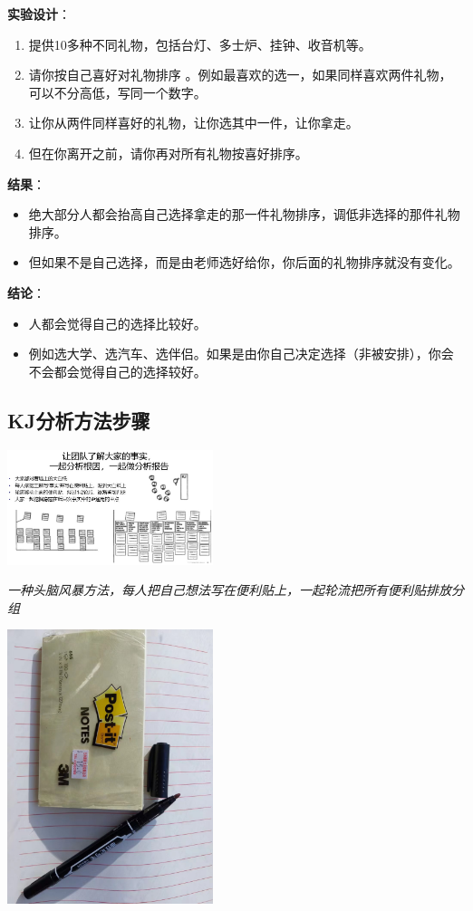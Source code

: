 \textbf{实验设计}：

\begin{enumerate}
\tightlist
\item
  提供10多种不同礼物，包括台灯、多士炉、挂钟、收音机等。
\item
  请你按自己喜好对礼物排序
  。例如最喜欢的选一，如果同样喜欢两件礼物，可以不分高低，写同一个数字。
\item
  让你从两件同样喜好的礼物，让你选其中一件，让你拿走。
\item
  但在你离开之前，请你再对所有礼物按喜好排序。
\end{enumerate}

\textbf{结果}：

\begin{itemize}
\tightlist
\item
  绝大部分人都会抬高自己选择拿走的那一件礼物排序，调低非选择的那件礼物排序。
\item
  但如果不是自己选择，而是由老师选好给你，你后面的礼物排序就没有变化。
\end{itemize}

\textbf{结论}：

\begin{itemize}
\tightlist
\item
  人都会觉得自己的选择比较好。
\item
  例如选大学、选汽车、选伴侣。如果是由你自己决定选择（非被安排），你会不会都会觉得自己的选择较好。
\end{itemize}

\hypertarget{kjux5206ux6790ux65b9ux6cd5ux6b65ux9aa4}{%
\subsection{KJ分析方法步骤}\label{kjux5206ux6790ux65b9ux6cd5ux6b65ux9aa4}}

\includegraphics[width=6cm]{Kj1Screenshot2023-11-01133052.jpg}

\emph{一种头脑风暴方法，每人把自己想法写在便利贴上，一起轮流把所有便利贴排放分组}

\includegraphics[width=6cm]{微信图片_20231027091622.jpg}

